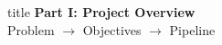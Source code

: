\documentclass[aspectratio=169,xcolor=dvipsnames]{beamer}
\begin{document}
\begin{frame}[plain]
    \centering
    \vfill
    \begin{beamercolorbox}[center,shadow=true,rounded=true]{title}
        \textbf{Part I: Project Overview}\\
        \vspace{0.5em}
        \large Problem $\to$ Objectives $\to$ Pipeline
    \end{beamercolorbox}
    \vfill
\end{frame}

\end{document}
